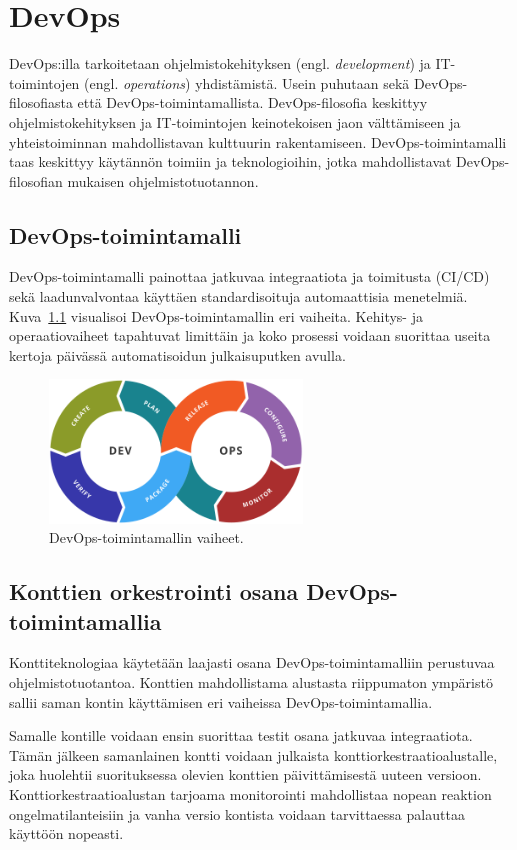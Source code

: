 \chapter{DevOps\label{devops}}

DevOps:illa tarkoitetaan ohjelmistokehityksen (engl. \textit{development}) ja IT-toimintojen (engl. \textit{operations}) yhdistämistä. Usein puhutaan sekä DevOps-filosofiasta että DevOps-toimintamallista. DevOps-filosofia keskittyy ohjelmistokehityksen ja IT-toimintojen keinotekoisen jaon välttämiseen ja yhteistoiminnan mahdollistavan kulttuurin rakentamiseen. DevOps-toimintamalli taas keskittyy käytännön toimiin ja teknologioihin, jotka mahdollistavat DevOps-filosofian mukaisen ohjelmistotuotannon. \cite{Klein21}

\section{DevOps-toimintamalli}

DevOps-toimintamalli painottaa jatkuvaa integraatiota ja toimitusta (CI/CD) sekä laadunvalvontaa käyttäen standardisoituja automaattisia menetelmiä. Kuva~\ref{fig:devops} visualisoi DevOps-toimintamallin eri vaiheita. Kehitys- ja operaatiovaiheet tapahtuvat limittäin ja koko prosessi voidaan suorittaa useita kertoja päivässä automatisoidun julkaisuputken avulla. \cite{Jabbari16}

\begin{figure}[ht]
\begin{center}
\includegraphics[width=0.6\textwidth]{figures/devops_toolchain.png}
\caption{DevOps-toimintamallin vaiheet.\cite{Wikimedia23}\label{fig:devops}}
\end{center}
\end{figure}

\section{Konttien orkestrointi osana DevOps-toimintamallia}

Konttiteknologiaa käytetään laajasti osana DevOps-toimintamalliin perustuvaa ohjelmistotuotantoa. Konttien mahdollistama alustasta riippumaton ympäristö sallii saman kontin käyttämisen eri vaiheissa DevOps-toimintamallia. \cite{Kang16}

Samalle kontille voidaan ensin suorittaa testit osana jatkuvaa integraatiota. Tämän jälkeen samanlainen kontti voidaan julkaista konttiorkestraatioalustalle, joka huolehtii suorituksessa olevien konttien päivittämisestä uuteen versioon. Konttiorkestraatioalustan tarjoama monitorointi mahdollistaa nopean reaktion ongelmatilanteisiin ja vanha versio kontista voidaan tarvittaessa palauttaa käyttöön nopeasti. \cite{Watada19, Kang16}
